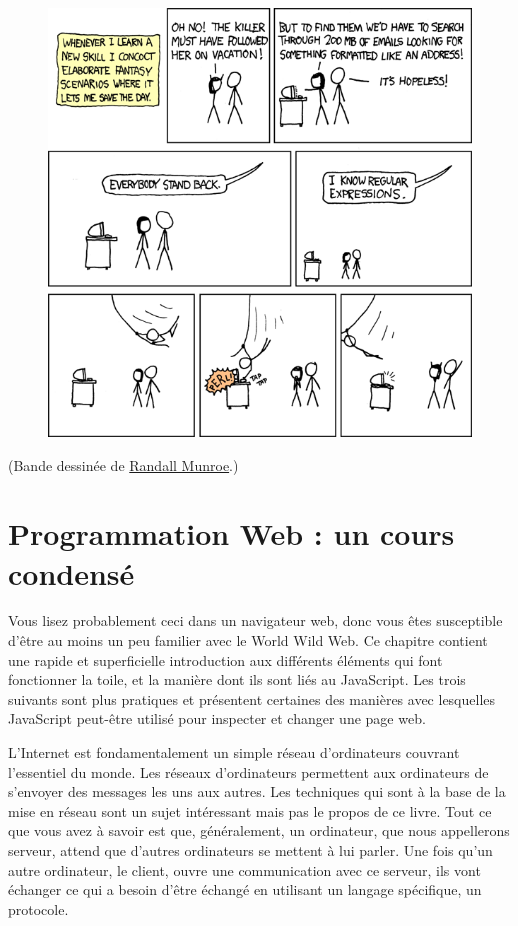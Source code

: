 \documentclass{FramateX}
\begin{document}
\begin{figure}[ht!]
\centering
\includegraphics{img/xkcd_regular_expressions.png}
\caption{}
\end{figure}

(Bande dessinée de \href{http://xkcd.com}{Randall Munroe}.)


\chapter{Programmation Web : un cours condensé}

Vous lisez probablement ceci dans un navigateur web, donc vous êtes
susceptible d'être au moins un peu familier avec le World Wild Web. Ce
chapitre contient une rapide et superficielle introduction aux
différents éléments qui font fonctionner la toile, et la manière dont
ils sont liés au JavaScript. Les trois suivants sont plus pratiques et
présentent certaines des manières avec lesquelles JavaScript peut-être
utilisé pour inspecter et changer une page web.

\begin{center}\end{center}

L'Internet est fondamentalement un simple réseau d'ordinateurs couvrant
l'essentiel du monde. Les réseaux d'ordinateurs permettent aux
ordinateurs de s'envoyer des messages les uns aux autres. Les techniques
qui sont à la base de la mise en réseau sont un sujet intéressant mais
pas le propos de ce livre. Tout ce que vous avez à savoir est que,
généralement, un ordinateur, que nous appellerons serveur, attend que
d'autres ordinateurs se mettent à lui parler. Une fois qu'un autre
ordinateur, le client, ouvre une communication avec ce serveur, ils vont
échanger ce qui a besoin d'être échangé en utilisant un langage
spécifique, un protocole.
\end{document}
